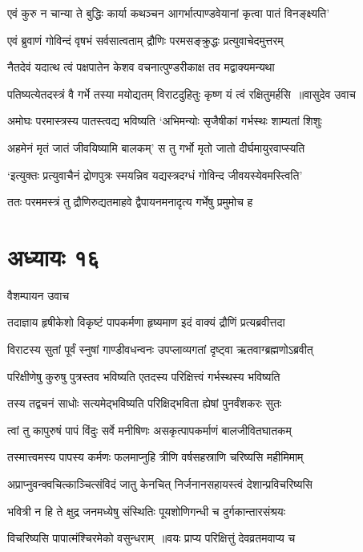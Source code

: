 \twolineshloka
{एवं कुरु न चान्या ते बुद्धिः कार्या कथञ्चन}
{आगर्भात्पाण्डवेयानां कृत्वा पातं विनङ्क्ष्यति'}


\twolineshloka
{एवं ब्रुवाणं गोविन्दं वृषभं सर्वसात्वताम्}
{द्रौणिः परमसङ्क्रुद्धः प्रत्युवाचेदमुत्तरम्}


\twolineshloka
{नैतदेवं यदात्थ त्वं पक्षपातेन केशव}
{वचनात्पुण्डरीकाक्ष तव मद्वाक्यमन्यथा}


\threelineshloka
{पतिष्यत्येतदस्त्रं वै गर्भे तस्या मयोद्यतम्}
{विराटदुहितुः कृष्ण यं त्वं रक्षितुमर्हसि ॥वासुदेव उवाच}
{}


\twolineshloka
{अमोघः परमास्त्रस्य पातस्त्वद्य भविष्यति}
{`अभिमन्योः सृजैषीकां गर्भस्थः शाम्यतां शिशुः}


\twolineshloka
{अहमेनं मृतं जातं जीवयिष्यामि बालकम्'}
{स तु गर्भो मृतो जातो दीर्घमायुरवाप्स्यति}


\twolineshloka
{`इत्युक्तः प्रत्युवाचैनं द्रोणपुत्रः स्मयन्निव}
{यद्यस्त्रदग्धं गोविन्द जीवयस्येवमस्त्विति'}


\twolineshloka
{ततः परममस्त्रं तु द्रौणिरुद्यतमाहवे}
{द्वैपायनमनादृत्य गर्भेषु प्रमुमोच ह}


\chapter{अध्यायः १६}
\twolineshloka
{वैशम्पायन उवाच}
{}


\twolineshloka
{तदाज्ञाय हृषीकेशो विकृष्टं पापकर्मणा}
{हृष्यमाण इदं वाक्यं द्रौणिं प्रत्यब्रवीत्तदा}


\twolineshloka
{विराटस्य सुतां पूर्वं स्नुषां गाण्डीवधन्वनः}
{उपप्लाव्यगतां दृष्ट्वा ऋतवाग्ब्रह्मणोऽब्रवीत्}


\twolineshloka
{परिक्षीणेषु कुरुषु पुत्रस्तव भविष्यति}
{एतदस्य परिक्षित्त्वं गर्भस्थस्य भविष्यति}


\twolineshloka
{तस्य तद्वचनं साधोः सत्यमेद्भविष्यति}
{परिक्षिद्भविता ह्येषां पुनर्वंशकरः सुतः}


\twolineshloka
{त्वां तु कापुरुषं पापं विंदुः सर्वे मनीषिणः}
{असकृत्पापकर्माणं बालजीवितघातकम्}


\twolineshloka
{तस्मात्त्वमस्य पापस्य कर्मणः फलमाप्नुहि}
{त्रीणि वर्षसहस्राणि चरिष्यसि महीमिमाम्}


\twolineshloka
{अप्राप्नुवन्क्वचित्काञ्चित्संविदं जातु केनचित्}
{निर्जनानसहायस्त्वं देशान्प्रविचरिष्यसि}


\threelineshloka
{भवित्री न हि ते क्षुद्र जनमध्येषु संस्थितिः}
{पूयशोणिगन्धी च दुर्गकान्तारसंश्रयः}
{}


\twolineshloka
{विचरिष्यसि पापात्मंश्चिरमेको वसुन्धराम् ॥वयः प्राप्य परिक्षित्तुं देवव्रतमवाप्य च}
{}


